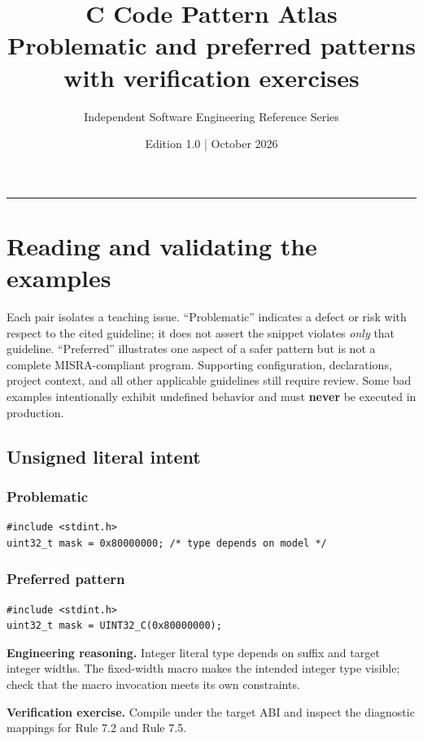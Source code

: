 \documentclass[10pt,letterpaper]{article}
\title{\vspace{-2.3em}\color{DeepNavy}\Huge\bfseries C Code Pattern Atlas\\[0.45em]\large\normalfont\color{Teal} Problematic and preferred patterns with verification exercises}
\author{Independent Software Engineering Reference Series}
\date{Edition 1.0 \quad | \quad October 2026}
\begin{document}
\maketitle
\vspace{-0.4em}
\begin{center}\color{Slate}\rule{0.83\linewidth}{0.4pt}\end{center}
\DocNotes
\tableofcontents
\newpage

\section{Reading and validating the examples}
Each pair isolates a teaching issue. ``Problematic'' indicates a defect or risk with respect to the cited guideline; it does not assert the snippet violates \emph{only} that guideline. ``Preferred'' illustrates one aspect of a safer pattern but is not a complete MISRA-compliant program. Supporting configuration, declarations, project context, and all other applicable guidelines still require review. Some bad examples intentionally exhibit undefined behavior and must \textbf{never} be executed in production.
\subsection{Unsigned literal intent}
\subsubsection*{Problematic}
\begin{lstlisting}[style=engineerc]
#include <stdint.h>
uint32_t mask = 0x80000000; /* type depends on model */
\end{lstlisting}
\subsubsection*{Preferred pattern}
\begin{lstlisting}[style=engineerc]
#include <stdint.h>
uint32_t mask = UINT32_C(0x80000000);
\end{lstlisting}
\textbf{Engineering reasoning.} Integer literal type depends on suffix and target integer widths. The fixed-width macro makes the intended integer type visible; check that the macro invocation meets its own constraints.

\textbf{Verification exercise.} Compile under the target ABI and inspect the diagnostic mappings for Rule 7.2 and Rule 7.5.
\end{document}

